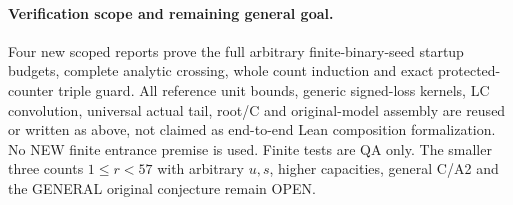 \paragraph{Verification scope and remaining general goal.}
Four new scoped reports prove the full arbitrary finite-binary-seed
startup budgets, complete analytic crossing, whole count induction
and exact protected-counter triple guard. All reference unit bounds,
generic signed-loss kernels, LC convolution, universal actual tail,
root/C and original-model assembly are reused or written as above,
not claimed as end-to-end Lean composition formalization.
No NEW finite entrance premise is used. Finite tests are QA only.
The smaller three counts $1\le r<57$ with arbitrary $u,s$, higher
capacities, general C/A2 and the GENERAL original conjecture remain OPEN.
